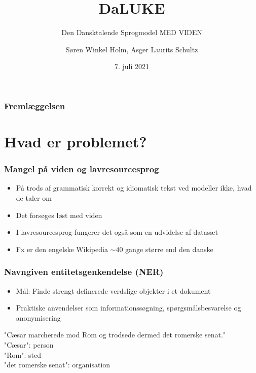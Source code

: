 \documentclass{beamer}
\title{DaLUKE}
\subtitle{
    Den Dansktalende Sprogmodel MED VIDEN
}
\author[Søren Holm, Asger Schultz]{Søren Winkel Holm, Asger Laurits Schultz}
\institute[DTU]{Danmarks Tekniske Universitet}
\date{7. juli 2021}
\begin{document}
\begin{frame}
    \titlepage
\end{frame}



\begin{frame}
    \frametitle{Fremlæggelsen}
    \footnotesize
    \tableofcontents
\end{frame}

\section{Hvad er problemet?}
\begin{frame}
    \frametitle{Mangel på viden og lavresourcesprog}
    \begin{itemize}
        \item På trods af grammatisk korrekt og idiomatisk tekst ved modeller ikke, hvad de taler om\footnotemark
        \item Det forsøges løst med viden
        \item I lavresourcesprog fungerer det også som en udvidelse af datasæt
        \item Fx er den engelske Wikipedia $ \sim 40 $ gange større end den danske
    \end{itemize}
\end{frame}

\begin{frame}
    \frametitle{Navngiven entitetsgenkendelse (NER)}
    \begin{itemize}
        \item Mål: Finde strengt definerede verdslige objekter i et dokument
        \item Praktiske anvendelser som informationssøgning, spørgsmålsbesvarelse og anonymisering
    \end{itemize}
    \begin{example}
        "Cæsar marcherede mod Rom og trodsede dermed det romerske senat."\\
        "Cæsar": person\\
        "Rom": sted\\
        "det romerske senat": organisation
    \end{example}
\end{frame}
\end{document}
